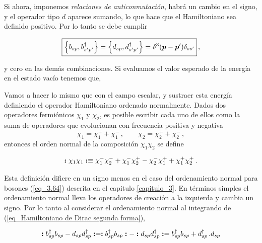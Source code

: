 Si ahora, imponemos \emph{relaciones de anticonmutación}, habrá un cambio en el signo, y el operador tipo  $d$ aparece sumando, lo que hace que el Hamiltoniano sea definido positivo. Por lo tanto se debe cumplir

\begin{equation}
	\boxed{\acomm{\Ob_{sp}}{\Ob^\dag_{\spr  \pp}} = \acomm{\Od_{sp}}{\Od^\dag_{\spr  \pp}} = \ddiracp \delta_{s \spr} } \, ,
	\label{eq_relaciones de anticonmutación entre creador y destructor}
\end{equation}

y cero en las demás combinaciones. Si evaluamos el valor esperado de la energía en el estado vacío tenemos que,



Vamos a hacer lo mismo que con el campo escalar, y sustraer esta energía definiendo el operador Hamiltoniano ordenado normalmente. Dados dos operadores fermiónicos $\chi_1$ y $\chi_2$, es posible escribir cada uno de ellos como la suma de operadores que evolucionan con frecuencia positiva y negativa
\begin{equation*}
	\chi_1 = \chi_1^+ + \chi_1^- \, , \qquad  \chi_2 = \chi_2^+ + \chi_2^- \, ,
\end{equation*}
entonces el orden normal de la composición $\chi_1 \chi_2$ se define

\begin{equation}
	 \vb*{:} \chi_1 \chi_1 \vb*{:} \equiv \chi_1^- \chi_2^- + \chi_1^- \chi_2^+ - \chi_2^- \chi_1^+ + \chi_1^+ \chi_2^+ \, .
\end{equation}

Esta definición difiere en un signo menos en el caso del ordenamiento normal para bosones (\ref{eq_3.64}) descrita en el capitulo \ref{capitulo_3}. En términos simples el ordenamiento normal lleva los operadores de creación a la izquierda y cambia un signo. Por lo tanto al considerar el ordenamiento normal al integrando de (\ref{eq_Hamiltoniano de Dirac segunda forma}),

\begin{equation}
	\vb*{:} b^\dag_{sp} b_{s  p} -  d_{sp}  d^\dag_{s p} \vb*{:} = \vb*{:} b^\dag_{sp} b_{s  p} \vb*{:}  -  \vb*{:} d_{sp}  d^\dag_{s p} \vb*{:}  = b^\dag_{sp} b_{s  p} +  d^\dag_{sp} \, .  d_{s p} 
\end{equation}

